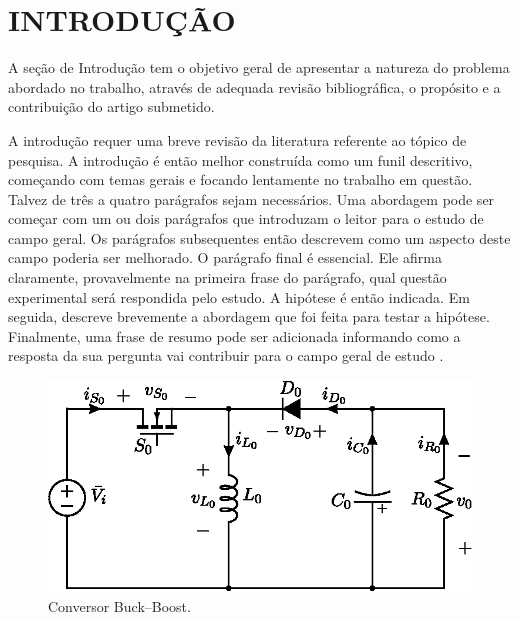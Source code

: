 %


\section{INTRODUÇÃO}


A seção de Introdução tem o objetivo geral de apresentar a natureza do problema abordado no trabalho, através de adequada revisão bibliográfica, o propósito e a contribuição do artigo submetido.

A introdução requer uma breve revisão da literatura referente ao tópico de pesquisa. A introdução é então melhor construída como um funil descritivo, começando com temas gerais e focando lentamente no trabalho em questão. Talvez de três a quatro parágrafos sejam necessários. Uma abordagem pode ser começar com um ou dois parágrafos que introduzam o leitor para o estudo de campo geral. Os parágrafos subsequentes então descrevem como um aspecto deste campo poderia ser melhorado. O parágrafo final é essencial. Ele afirma claramente, provavelmente na primeira frase do parágrafo, qual questão experimental será respondida pelo estudo. A hipótese é então indicada. Em seguida, descreve brevemente a abordagem que foi feita para testar a hipótese. Finalmente, uma frase de resumo pode ser adicionada informando como a resposta da sua pergunta vai contribuir para o campo geral de estudo .

\begin{figure}[!h]
	\centering
	\includegraphics[width=0.9\linewidth]{Figs/BuckBoost}
	\caption{Conversor Buck--Boost.}
	\label{fig:buckboost}
\end{figure}

